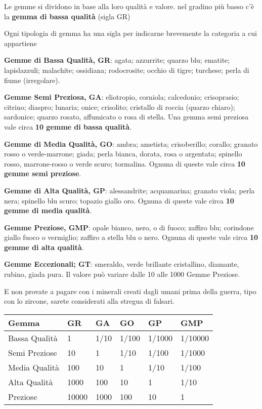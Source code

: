\documentclass[12pt,a4paper,twoside,openany]{book}
\begin{document}
\begin{multicols}{2}
Le gemme si dividono in base alla loro qualità e valore. nel gradino più basso c'è la \textbf{gemma di bassa qualità} (sigla GR)

Ogni tipologia di gemma ha una sigla per indicarne brevemente la categoria a cui appartiene

\textbf{Gemme di Bassa Qualità, GR}: agata; azzurrite; quarzo blu; ematite; lapislazzuli; malachite; ossidiana; rodocrosite; occhio di tigre; turchese; perla di fiume (irregolare).

\textbf{Gemme Semi Preziosa, GA}: eliotropio, corniola; calcedonio; crisoprasio; citrino; diaspro; lunaria; onice; crisolito; cristallo di roccia (quarzo chiaro); sardonice; quarzo rosato, affumicato o rosa di stella. Una gemma semi preziosa vale circa \textbf{10 gemme di bassa qualità}.

\textbf{Gemme di Media Qualità, GO}: ambra; ametista; crisoberillo; corallo; granato rosso o verde-marrone; giada; perla bianca, dorata, rosa o argentata; spinello rosso, marrone-rosso o verde scuro; tormalina. Ognuna di queste vale circa \textbf{10 gemme semi preziose}.

\textbf{Gemme di Alta Qualità, GP}: alessandrite; acquamarina; granato viola; perla nera; spinello blu scuro; topazio giallo oro.  Ognuna di queste vale circa \textbf{10 gemme di media qualità}.

\textbf{Gemme Preziose, GMP}: opale bianco, nero, o di fuoco; zaffiro blu; corindone giallo fuoco o vermiglio; zaffiro a stella blu o nero. Ognuna di queste vale circa \textbf{10 gemme di alta qualità}.

\textbf{Gemme Eccezionali; GT}: smeraldo, verde brillante cristallino, diamante, rubino, giada pura. Il valore può variare dalle 10 alle 1000 Gemme Preziose.

E non provate a pagare con i minerali creati dagli umani prima della guerra, tipo con lo zircone, sarete considerati alla stregua di falsari.

\end{multicols}

\begin{tabular}{llllll}
	
\textbf{Gemma} & \textbf{GR}& \textbf{GA} &\textbf{GO} &\textbf{GP} &\textbf{GMP} \\
	\toprule
Bassa Qualità	& 1		 &1/10	&1/100	&1/1000	&1/10000 \\
Semi Preziose	& 10	 &1		&1/10	&1/100	&1/1000 \\
Media Qualità	& 100	 &10	&1		&1/10	&1/100	 \\
Alta Qualità 	& 1000   &100  	&10		&1	 	&1/10	\\
Preziose	 	& 10000  &1000 	&100  	&10		&1	\\

\end{tabular}
\end{document}
